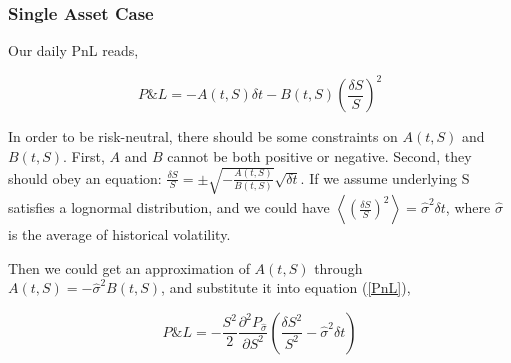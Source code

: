 \documentclass[a4]{article}
\begin{document}
\subsubsection{Single Asset Case}
\noindent Our daily PnL reads,\par 
\begin{equation}\label{PnL}
P\&L = -A(t,S)\delta t - B(t,S)(\frac{\delta S}{S})^{2}
\end{equation} \par 
In order to be risk-neutral, there should be some constraints on $A(t,S)$ and $B(t,S)$. First, $A$ and $B$ cannot be both positive or negative. Second, they should obey an equation: $\frac{\delta S}{S}=\pm \sqrt{-\frac{A(t,S)}{B(t,S)}}\sqrt{\delta t}$. If we assume underlying S satisfies a lognormal distribution, and we could have $\left\langle \left( \frac{\delta S}{S}\right)^{2}\right\rangle =\hat{\sigma}^{2}\delta t$, where $\hat{\sigma}$ is the average of historical volatility. \par 
\bigbreak 
Then we could get an approximation of $A(t,S)$ through $A(t,S)=-\hat{\sigma}^{2}B(t,S)$, and substitute it into equation (\ref{PnL}),\par 
\begin{equation}\label{PnL_vol}
P\&L = -\dfrac{S^{2}}{2}\dfrac{\partial^{2}P_{\hat{\sigma}}}{\partial S^{2}}\left(\dfrac{\delta S^{2}}{S^{2}}-\hat{\sigma}^{2}\delta t\right)
\end{equation}
\end{document}
